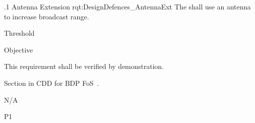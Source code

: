 \ONERQMTVKPP
{\RqtNumberBase.1}
{Antenna Extension}
{rqt:DesignDefences_AntennaExt}
{The \ThisSys shall use an antenna to increase broadcast range.}
{
	\item [Tethered (wired) Antenna] Threshold
	\item [Drone (wireless)] Objective
}
{This requirement shall be verified by demonstration.}
{
\item [5.6.2] Section in CDD for BDP FoS~\cite{ref__BDP_FOS_CDD}.
}
{
	\item N/A
}
{P1}
